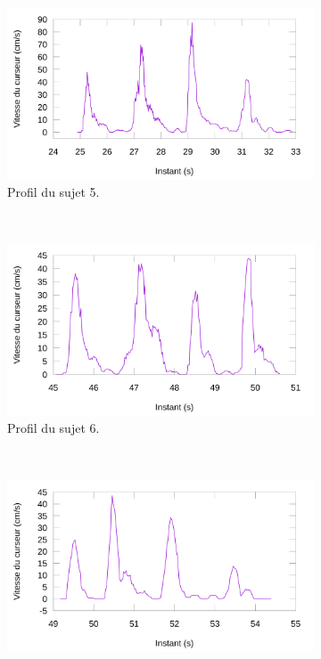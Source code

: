 	\begin{figure}[htb]
		\centering
		\begin{subfigure}[t]{\subImgWlineplot}
			\centering
			\includegraphics[width=\textwidth]{figures/ch4/subject_05_static_condition_smoothed}
			\caption{Profil du sujet 5.}
			\label{fig:staticProfile5}
		\end{subfigure}
		~
		\begin{subfigure}[t]{\subImgWlineplot}
			\centering
			\includegraphics[width=\textwidth]{figures/ch4/subject_06_static_condition_smoothed}
			\caption{Profil du sujet 6.}
			\label{fig:staticProfile6}
		\end{subfigure}
		~
		\begin{subfigure}[t]{\subImgWlineplot}
			\centering
			\includegraphics[width=\textwidth]{figures/ch4/subject_08_static_condition_smoothed}

\end{subfigure}
\end{figure}
